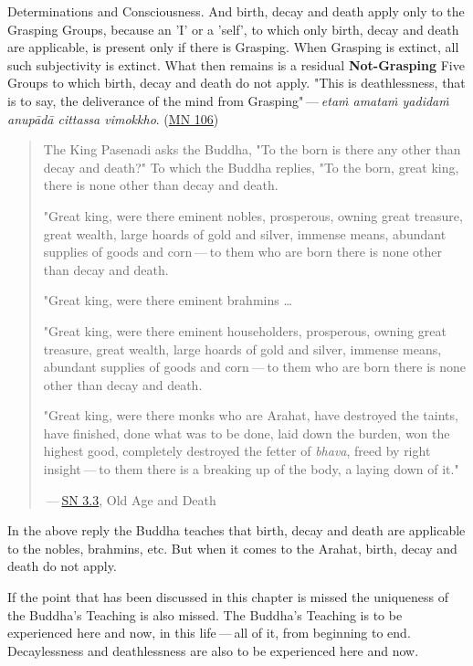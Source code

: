 Determinations and Consciousness. And birth, decay and death apply only
to the Grasping Groups, because an 'I' or a 'self', to which only birth,
decay and death are applicable, is present only if there is Grasping.
When Grasping is extinct, all such subjectivity is extinct. What then
remains is a residual \textbf{Not-Grasping} Five Groups to which birth, decay
and death do not apply. "This is deathlessness, that is to say, the
deliverance of the mind from Grasping" — \emph{etaṁ amataṁ yadidaṁ anupādā
cittassa vimokkho}. (\href{https://suttacentral.net/mn106/en/sujato}{MN 106})


\begin{quotation}
The King Pasenadi asks the Buddha, "To the born is there any other than
decay and death?" To which the Buddha replies, "To the born, great king,
there is none other than decay and death.


"Great king, were there eminent
nobles, prosperous, owning great treasure, great wealth, large hoards of
gold and silver, immense means, abundant supplies of goods and corn — to them who are born there is none other than decay and death.


"Great king, were there eminent brahmins …​


"Great king, were there eminent
householders, prosperous, owning great treasure, great wealth, large
hoards of gold and silver, immense means, abundant supplies of goods and
corn — to them who are born there is none other than decay and death.


"Great king, were there monks who are Arahat, have destroyed the taints,
have finished, done what was to be done, laid down the burden, won the
highest good, completely destroyed the fetter of \emph{bhava}, freed by
right insight — to them there is a breaking up of the body, a laying
down of it."


 — \href{https://suttacentral.net/sn3.3/en/sujato}{SN 3.3}, Old Age and Death


\end{quotation}

In the above reply the Buddha teaches that birth, decay and death are
applicable to the nobles, brahmins, etc. But when it comes to the
Arahat, birth, decay and death do not apply.


If the point that has been discussed in this chapter is missed the
uniqueness of the Buddha’s Teaching is also missed. The Buddha’s
Teaching is to be experienced here and now, in this life — all of it,
from beginning to end. Decaylessness and deathlessness are also to be
experienced here and now.


